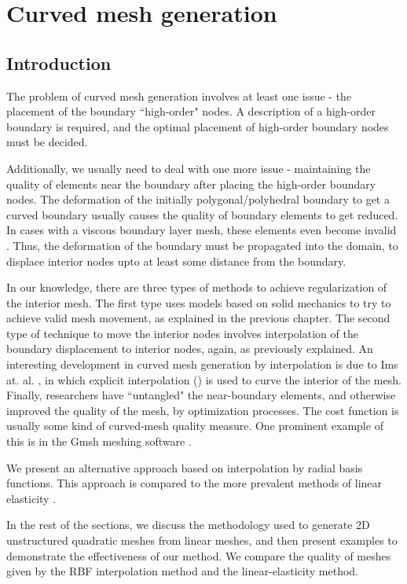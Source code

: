 \chapter{Curved mesh generation}
\section{Introduction}

The problem of curved mesh generation involves at least one issue - the placement of the boundary ``high-order" nodes. A description of a high-order boundary is required, and the optimal placement of high-order boundary nodes must be decided.

Additionally, we usually need to deal with one more issue - maintaining the quality of elements near the boundary after placing the high-order boundary nodes. The deformation of the initially polygonal/polyhedral boundary to get a curved boundary usually causes the quality of boundary elements to get reduced. In cases with a viscous boundary layer mesh, these elements even become invalid \cite{curve:persson, gmsh:untangling}. Thus, the deformation of the boundary must be propagated into the domain, to displace interior nodes upto at least some distance from the boundary.

In our knowledge, there are three types of methods to achieve regularization of the interior mesh. The first type uses models based on solid mechanics to try to achieve valid mesh movement, as explained in the previous chapter. The second type of technique to move the interior nodes involves interpolation of the boundary displacement to interior nodes, again, as previously explained. An interesting development in curved mesh generation by interpolation is due to Ims at. al. \cite{curve:meshcurve}, in which explicit interpolation (\cite{mm:explicit}) is used to curve the interior of the mesh. Finally, researchers have ``untangled" the near-boundary elements, and otherwise improved the quality of the mesh, by optimization processes. The cost function is usually some kind of curved-mesh quality measure. One prominent example of this is in the Gmsh meshing software \cite{gmsh:untangling}.

We present an alternative approach based on interpolation by radial basis functions. This approach is compared to the more prevalent methods of linear elasticity \cite{curve:hartmann}.

In the rest of the sections, we discuss the methodology used to generate 2D unstructured quadratic meshes from linear meshes, and then present examples to demonstrate the effectiveness of our method. We compare the quality of meshes given by the RBF interpolation method and the linear-elasticity method.

